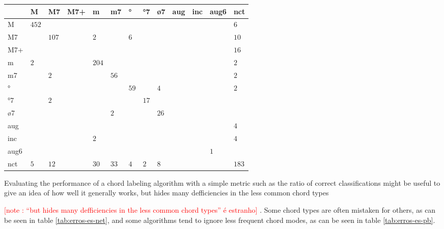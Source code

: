 \documentclass{article}
\newcounter{notecounter}
\newcommand{\note}[1]{
  \addtocounter{notecounter}{1}
  \textcolor{red}{[note \arabic{notecounter}: #1]}
}
\begin{document}
\begin{table*}
\centering
\begin{tabular}{l|p{0.55cm}|p{0.55cm}|p{0.55cm}|p{0.55cm}|p{0.55cm}|p{0.55cm}|p{0.55cm}|p{0.55cm}|p{0.55cm}|p{0.55cm}|p{0.55cm}|p{0.55cm}}
      &     M &    M7 &   M7+ &     m &    m7 &    ° &   °7 &   ø7 &   aug &   inc &  aug6 &   nct  \\  \hline
    M & $ 452 $& $ $& $ $& $ $& $ $& $ $& $ $& $ $& $ $& $ $& $ $& $   6 $ \\ \hline
   M7 & $ $& $ 107 $& $ $& $   2 $& $ $& $   6 $& $ $& $ $& $ $& $ $& $ $& $  10 $ \\ \hline
  M7+ & $ $& $ $& $ $& $ $& $ $& $ $& $ $& $ $& $ $& $ $& $ $& $  16 $ \\ \hline
    m & $   2 $& $ $& $ $& $ 204 $& $ $& $ $& $ $& $ $& $ $& $ $& $ $& $   2 $ \\ \hline
   m7 & $ $& $   2 $& $ $& $ $& $  56 $& $ $& $ $& $ $& $ $& $ $& $ $& $   2 $ \\ \hline
    ° & $ $& $ $& $ $& $ $& $ $& $  59 $& $ $& $   4 $& $ $& $ $& $ $& $   2 $ \\ \hline
   °7 & $ $& $   2 $& $ $& $ $& $ $& $ $& $  17 $& $ $& $ $& $ $& $ $& $ $ \\ \hline
   ø7 & $ $& $ $& $ $& $ $& $   2 $& $ $& $ $& $  26 $& $ $& $ $& $ $& $ $ \\ \hline
  aug & $ $& $ $& $ $& $ $& $ $& $ $& $ $& $ $& $ $& $ $& $ $& $   4 $ \\ \hline
  inc & $ $& $ $& $ $& $   2 $& $ $& $ $& $ $& $ $& $ $& $ $& $ $& $   4 $ \\ \hline
 aug6 & $ $& $ $& $ $& $ $& $ $& $ $& $ $& $ $& $ $& $ $& $   1 $& $ $ \\ \hline
  nct & $   5 $& $  12 $& $ $& $  30 $& $  33 $& $   4 $& $   2 $& $   8 $& $ $& $ $& $ $& $ 183 $ \\ \hline
\end{tabular}


\caption{Classifications made by our best algorithm, \texttt{ES-net}. The rows represent
  the expected answers while the columns are the returned
  results. Note that the matrix is not symmetric.}
\label{tab:erros-es-net}
\end{table*}



Evaluating the performance of a chord labeling algorithm with a simple
metric such as the ratio of correct classifications might be useful to
give an idea of how well it generally works, but hides many
defficiencies in the less common chord types \note{``but hides many
  defficiencies in the less common chord types'' é estranho}. Some
chord types are often mistaken for others, as can be seen in table
\ref{tab:erros-es-net}, and some algorithms tend to ignore less
frequent chord modes, as can be seen in table \ref{tab:erros-es-pb}.
\end{document}
